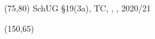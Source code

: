 \documentclass [8pt]{article}
\begin{document}
\pagestyle{empty}

{
\begin{textblock}{60}(75,80)
SchUG §19(3a), TC, \Klasse, \Schuler, 2020/21
\end{textblock}

\begin{textblock}{45}(150,65)
\AddrA\\
\AddrB\\
\AddrC\\
\AddrD
\end{textblock}
\newpage
}
\end{document}
